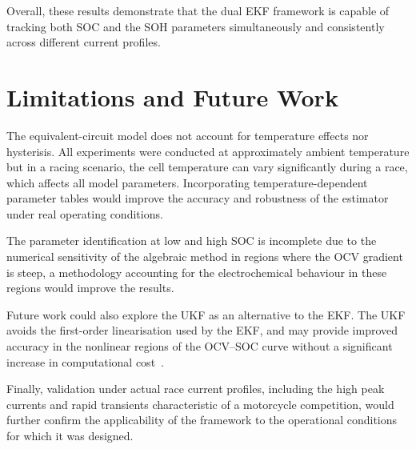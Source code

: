 Overall, these results demonstrate that the dual \ac{EKF} framework is capable of tracking 
both \ac{SOC} and the \ac{SOH} parameters simultaneously and consistently across different 
current profiles.

\section{Limitations and Future Work}

The equivalent-circuit model does not account for temperature effects nor hysterisis. All experiments were 
conducted at approximately ambient temperature but in a racing scenario, the cell temperature can vary 
significantly during a race, which affects all model parameters. Incorporating temperature-dependent 
parameter tables would improve the accuracy and robustness of the estimator 
under real operating conditions.

The parameter identification at low and high \ac{SOC} is incomplete due to the 
numerical sensitivity of the algebraic method in regions where the \ac{OCV} gradient is steep,
a methodology accounting for the electrochemical behaviour in these regions would improve the results.

Future work could also explore the \ac{UKF} as an alternative to the \ac{EKF}. The \ac{UKF} avoids 
the first-order linearisation used by the \ac{EKF}, and may provide improved accuracy in the 
nonlinear regions of the \ac{OCV}--\ac{SOC} curve without a significant increase in 
computational cost~\cite{plett2015battery}.

Finally, validation under actual race current profiles, including the high peak currents and 
rapid transients characteristic of a motorcycle competition, would further confirm the applicability of 
the framework to the operational conditions for which it was designed.